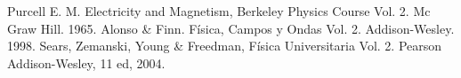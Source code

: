 \documentclass[12pt]{book}
\begin{document}










\begin{thebibliography}{}
 Purcell E. M. Electricity and Magnetism, Berkeley 
Physics Course Vol. 2. Mc Graw Hill. 1965. 
 Alonso \& Finn. Física, Campos y Ondas Vol. 2. Addison-Wesley. 
1998.
 Sears, Zemanski, Young \& Freedman, Física Universitaria Vol. 2. 
Pearson Addison-Wesley, 11 ed, 2004.
\end{thebibliography}
\end{document}
